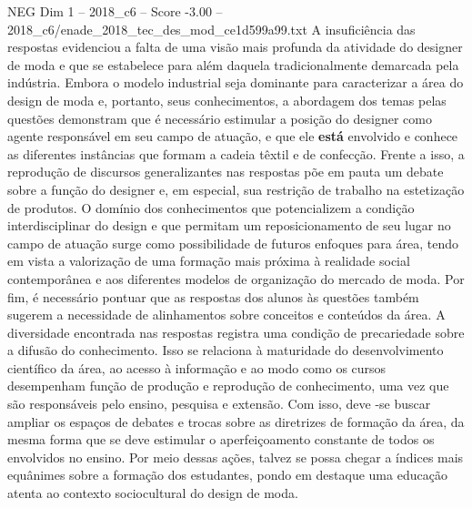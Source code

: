 \begin{textsample}{NEG Dim 1 – 2018\_c6 – Score -3.00 – 2018\_c6/enade\_2018\_tec\_des\_mod\_ce1d599a99.txt}
A insuficiência das respostas evidenciou a falta de uma visão mais profunda da atividade do designer de moda e que se estabelece para além daquela tradicionalmente demarcada pela indústria.
Embora o modelo industrial seja dominante para caracterizar a área do design de moda e, portanto, seus conhecimentos, a abordagem dos temas pelas questões demonstram que é necessário estimular a posição do designer como agente responsável em seu campo de atuação, e que ele \textbf{está} envolvido e conhece as diferentes instâncias que formam a cadeia têxtil e de confecção.
Frente a isso, a reprodução de discursos generalizantes nas respostas põe em pauta um debate sobre a função do designer e, em especial, sua restrição de trabalho na estetização de produtos.
O domínio dos conhecimentos que potencializem a condição interdisciplinar do design e que permitam um reposicionamento de seu lugar no campo de atuação surge como possibilidade de futuros enfoques para área, tendo em vista a valorização de uma formação mais próxima à realidade social contemporânea e aos diferentes modelos de organização do mercado de moda.
Por fim, é necessário pontuar que as respostas dos alunos às questões também sugerem a necessidade de alinhamentos sobre conceitos e conteúdos da área.
A diversidade encontrada nas respostas registra uma condição de precariedade sobre a difusão do conhecimento.
Isso se relaciona à maturidade do desenvolvimento científico da área, ao acesso à informação e ao modo como os cursos desempenham função de produção e reprodução de conhecimento, uma vez que são responsáveis pelo ensino, pesquisa e extensão.
Com isso, deve -se buscar ampliar os espaços de debates e trocas sobre as diretrizes de formação da área, da mesma forma que se deve estimular o aperfeiçoamento constante de todos os envolvidos no ensino.
Por meio dessas ações, talvez se possa chegar a índices mais equânimes sobre a formação dos estudantes, pondo em destaque uma educação atenta ao contexto sociocultural do design de moda.

\end{textsample}
